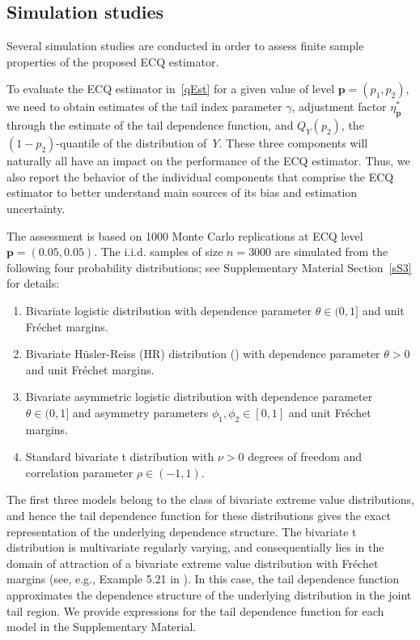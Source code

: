 \documentclass[11pt,letterpaper]{article}
\def\g{\gamma}
\def\h{\eta}
\def\n{\nu}
\def\r{\rho}
\def\pb{{\mathbf p}}
\numberwithin{equation}{section}
\begin{document}
\subsection{Simulation studies}\label{sim}

Several simulation studies are conducted in order to assess finite sample properties of the proposed ECQ estimator. 

To evaluate the ECQ estimator in~\eqref{qEst} for a given value of level $\pb=(p_1,p_2)$, we need to obtain estimates of the tail index parameter $\g$, adjustment factor $\h_\pb^*$ through the estimate of the   tail dependence function, and  $Q_Y(p_2)$, the $(1-p_2)$-quantile of the distribution of~$Y$. These three components will naturally all have an impact on the performance  of the ECQ estimator. Thus, we also report the behavior of the individual components that comprise the ECQ estimator to better understand main sources of its bias and estimation uncertainty. 

The assessment is based on 1000 Monte Carlo replications at ECQ level $\pb=(0.05,0.05)$. The i.i.d. samples of size $n=3000$ are simulated from the following four probability distributions; see Supplementary Material Section~\ref{sS3} for details: 
\begin{enumerate}[label=(\arabic*)]
    \item Bivariate logistic distribution with dependence parameter $\theta\in (0,1]$ and unit Fr\'{e}chet margins.
    
    \item Bivariate H\"{u}sler-Reiss (HR) distribution (\cite{HuslerReiss1989}) with dependence parameter $\theta >0$ and unit Fr\'{e}chet margins.

    \item Bivariate asymmetric logistic distribution with dependence parameter $\theta \in (0,1]$ and asymmetry parameters $\phi_1,\phi_2 \in [0,1]$ and unit Fr\'{e}chet margins.
    
    \item Standard bivariate t distribution with $\n>0$ degrees of freedom and correlation parameter $\r\in(-1,1)$.

\end{enumerate}

The first three models belong to the class of bivariate extreme value distributions, and hence the tail dependence function for these distributions gives the exact representation of the underlying dependence structure.  The bivariate t distribution is multivariate regularly varying, and consequentially lies in the domain of attraction of a bivariate extreme value distribution with  Fr\'{e}chet margins (see, e.g., Example 5.21 in \cite{Resnick1987}). In this case, the tail dependence function approximates the dependence structure of the underlying distribution in the joint tail region. We provide expressions for the tail dependence function for each model in the Supplementary Material.
\end{document}
